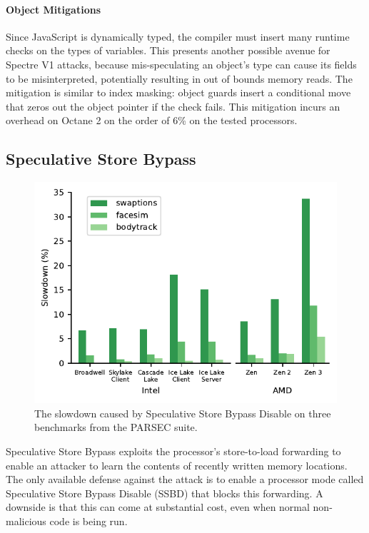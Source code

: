 \paragraph{Object Mitigations}

Since JavaScript is dynamically typed, the compiler must insert many runtime checks on the types of variables.
This presents another possible avenue for Spectre V1 attacks, because mis-speculating an object's type can cause its fields to be misinterpreted, potentially resulting in out of bounds memory reads.
The mitigation is similar to index masking: object guards insert a conditional move that zeros out the object pointer if the check fails.
This mitigation incurs an overhead on Octane 2 on the order of 6\% on the tested processors.

\subsection{Speculative Store Bypass}
\label{sec:ssb}

\begin{figure}[h]
  \includegraphics[width=\columnwidth]{plots/ssbd.pdf}
  \caption{The slowdown caused by Speculative Store Bypass Disable on three benchmarks from the PARSEC suite.}
  \label{fig:ssbd}
\end{figure}

Speculative Store Bypass exploits the processor's store-to-load forwarding to enable an attacker to learn the contents of recently written memory locations.
The only available defense against the attack is to enable a processor mode called Speculative Store Bypass Disable (SSBD) that blocks this forwarding.
A downside is that this can come at substantial cost, even when normal non-malicious code is being run.

